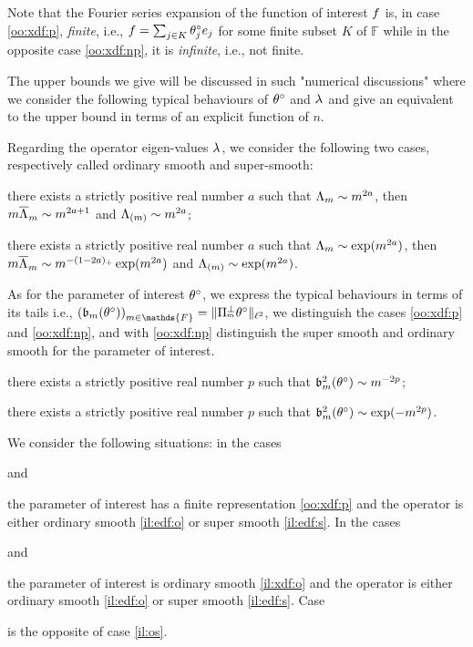 Note that the Fourier series expansion of the function of interest $\xdf$ is, in case \ref{oo:xdf:p}, \textit{finite}, i.e., $\xdf=\sum_{j\in K}\fxdf[j]\bas_j$
for some finite subset $K$ of $\mathds{F}$ while in the opposite case
\ref{oo:xdf:np}, it is \textit{infinite}, i.e., not finite.

\begin{il}\label{IL_INTRO_FREQ_DECISION}
The upper bounds we give will be discussed in such "numerical discussions" where we consider the following typical behaviours of $\fxdf$ and $\fedf$ and give an equivalent to the upper bound in terms of an explicit function of $n$.

Regarding the operator eigen-values $\fedf$, we consider the following two cases, respectively called ordinary smooth and super-smooth:
\begin{Liste}[]
\item[\mylabel{il:edf:o}{\dg\bfseries{(o)}}] there exists a strictly positive real number $a$ such that $\iSv[\Di]\sim \Di^{2a}$, then $\Di \oiSv\sim\Di^{2a+1}$ and $\miSv\sim\Di^{2a}$;
\item[\mylabel{il:edf:s}{\dg\bfseries{(s)}}] there exists a strictly positive real number $a$ such that $\iSv[\Di]\sim \exp(\Di^{2a})$, then $\Di \oiSv\sim \Di^{-(1-2a)_+}\exp(\Di^{2a})$ and $\miSv\sim \exp(\Di^{2a})$.
  \end{Liste}

As for the parameter of interest $\fxdf$, we express the typical behaviours in terms of its tails i.e., $\left(\bias[\Di](\fxdf)\right)_{\Di \in \mathds{F}} = \Vnormlp{\ProjC[\Di] \fxdf}$, we distinguish the cases \ref{oo:xdf:p} and \ref{oo:xdf:np}, and with \ref{oo:xdf:np} distinguish the super smooth and ordinary smooth for the parameter of interest.
\begin{Liste}[]
\item[\mylabel{il:xdf:o}{\dg\bfseries{(o)}}] there exists a strictly positive real number $p$ such that $\bias^2(\fxdf)\sim \Di^{-2p}$;
\item[\mylabel{il:xdf:s}{\dg\bfseries{(s)}}] there exists a strictly positive real number $p$ such that $\bias^2(\fxdf)\sim
  \exp(-\Di^{2p})$.
\end{Liste}

We consider the following situations: in the cases \begin{inparaenum}[i]
\item[\mylabel{il:po}{\dg\bfseries{[p-o]}}] and \item[\mylabel{il:ps}{\dg\bfseries{[p-s]}}] the parameter of interest has a finite representation \ref{oo:xdf:p} and the operator is either ordinary smooth \ref{il:edf:o} or super smooth \ref{il:edf:s}.
In the cases \item[\mylabel{il:oo}{\dg\bfseries{[o-o]}}] and \item[\mylabel{il:os}{\dg\bfseries{[o-s]}}] the parameter of interest is ordinary smooth \ref{il:xdf:o} and the operator is either ordinary smooth \ref{il:edf:o} or super smooth \ref{il:edf:s}.
Case \item[\mylabel{il:so}{\dg\bfseries{[s-o]}}] is the opposite of case \ref{il:os}.
\end{inparaenum}
\ilEnd
\end{il}

